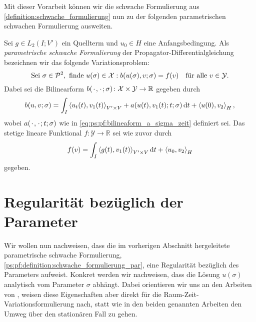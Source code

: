 Mit dieser Vorarbeit können wir die schwache Formulierung aus \cref{definition:schwache_formulierung} nun zu der folgenden parametrischen schwachen Formulierung ausweiten.

\begin{Definition}
\label{def:ps:pf:schwache_formulierung_par}
    Sei $g \in L_{2}(I; V')$ ein Quellterm und $u_{0} \in H$ eine Anfangsbedingung.
    Als \emph{parametrische schwache Formulierung} der Propagator-Differentialgleichung bezeichnen wir das folgende Variationsproblem:
    \begin{equation}
        \text{Sei}~\sigma \in \mathcal P^{2},~\text{finde}~u(\sigma) \in \mathcal X : b(u(\sigma), v; \sigma) = f(v) \quad \fa v \in \mathcal Y.
    \end{equation}
    Dabei sei die Bilinearform $b(\blank, \blank; \sigma) \colon \mathcal X \times \mathcal Y \to \mathbb{R}$ gegeben durch
     \begin{equation}
         \label{eq:ps:rzvp:schwache_formulierung_lhs_b_sigma}
         b(u, v; \sigma)
             = \int_{I} \skprod{u_{t}(t)}{v_{1}(t)}_{V' \times V} + a(u(t), v_{1}(t); t; \sigma) \diff t + \skprod{u(0)}{v_{2}}_{H},
     \end{equation}
     wobei $a(\blank, \blank; t; \sigma)$ wie in \cref{eq:ps:pf:bilineaform_a_sigma_zeit} definiert sei.
     Das stetige lineare Funktional $f \colon \mathcal Y \to \mathbb{R}$ sei wie zuvor durch
     \begin{equation}
         \label{eq:ps:rzvp:schwache_formulierung_rhs_f_sigma}
         f(v) = \int_{I} \skprod{g(t)}{v_{1}(t)}_{V' \times V} \diff t + \skprod{u_{0}}{v_{2}}_{H}
     \end{equation}
     gegeben.
\end{Definition}


\section{Regularität bezüglich der Parameter} %
\label{sec:regularit_t_bez_glich_der_parameter}

Wir wollen nun nachweisen, dass die im vorherigen Abschnitt hergeleitete parametrische schwache Formulierung, \cref{ps:pf:definition:schwache_formulierung_par}, eine Regularität bezüglich des Parameters aufweist.
Konkret werden wir nachweisen, dass die Lösung $u(\sigma)$ analytisch vom Parameter $\sigma$ abhängt.
Dabei orientieren wir uns an den Arbeiten von \textcite{Cohen:2010kz,Kunoth:2013ef}, weisen diese Eigenschaften aber direkt für die Raum-Zeit-Variationsformulierung nach, statt wie in den beiden genannten Arbeiten den Umweg über den stationären Fall zu gehen.

